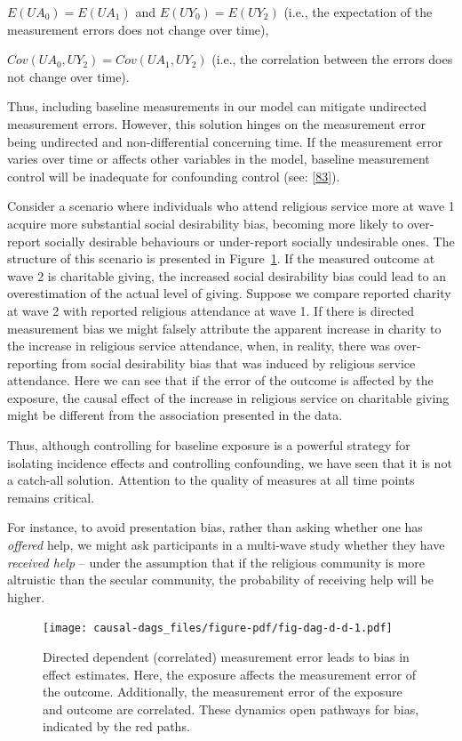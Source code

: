 \documentclass[
  singlecolumn]{article}
\begin{document}
\(E(UA_0) = E(UA_1)\) and \(E(UY_0) = E(UY_2)\) (i.e., the expectation
of the measurement errors does not change over time),

\(Cov(UA_0, UY_2) = Cov(UA_1, UY_2)\) (i.e., the correlation between the
errors does not change over time).

Thus, including baseline measurements in our model can mitigate
undirected measurement errors. However, this solution hinges on the
measurement error being undirected and non-differential concerning time.
If the measurement error varies over time or affects other variables in
the model, baseline measurement control will be inadequate for
confounding control (see: {[}\protect\hyperlink{ref-keogh2020}{83}{]}).

Consider a scenario where individuals who attend religious service more
at wave 1 acquire more substantial social desirability bias, becoming
more likely to over-report socially desirable behaviours or under-report
socially undesirable ones. The structure of this scenario is presented
in Figure~\ref{fig-dag-d-d}. If the measured outcome at wave 2 is
charitable giving, the increased social desirability bias could lead to
an overestimation of the actual level of giving. Suppose we compare
reported charity at wave 2 with reported religious attendance at wave 1.
If there is directed measurement bias we might falsely attribute the
apparent increase in charity to the increase in religious service
attendance, when, in reality, there was over-reporting from social
desirability bias that was induced by religious service attendance. Here
we can see that if the error of the outcome is affected by the exposure,
the causal effect of the increase in religious service on charitable
giving might be different from the association presented in the data.

Thus, although controlling for baseline exposure is a powerful strategy
for isolating incidence effects and controlling confounding, we have
seen that it is not a catch-all solution. Attention to the quality of
measures at all time points remains critical.

For instance, to avoid presentation bias, rather than asking whether one
has \emph{offered} help, we might ask participants in a multi-wave study
whether they have \emph{received help} -- under the assumption that if
the religious community is more altruistic than the secular community,
the probability of receiving help will be higher.

\begin{figure}

{\centering \texttt{[image: causal-dags\_files/figure-pdf/fig-dag-d-d-1.pdf]}

}

\caption{\label{fig-dag-d-d}Directed dependent (correlated) measurement
error leads to bias in effect estimates. Here, the exposure affects the
measurement error of the outcome. Additionally, the measurement error of
the exposure and outcome are correlated. These dynamics open pathways
for bias, indicated by the red paths.}

\end{figure}
\end{document}
